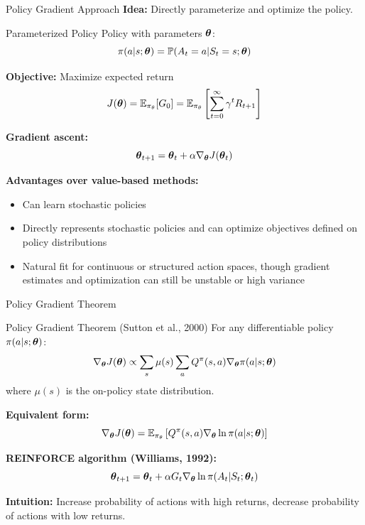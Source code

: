 \documentclass[aspectratio=169]{beamer}
\begin{document}
\begin{frame}{Policy Gradient Approach}
  \textbf{Idea:} Directly parameterize and optimize the policy.

  \vspace{0.5em}

  \begin{definitionbox}{Parameterized Policy}
    Policy with parameters $\boldsymbol{\theta}$:
    $$\pi(a|s; \boldsymbol{\theta}) = \mathbb{P}(A_t = a | S_t = s; \boldsymbol{\theta})$$
  \end{definitionbox}

  \vspace{0.5em}

  \textbf{Objective:} Maximize expected return
  $$J(\boldsymbol{\theta}) = \mathbb{E}_{\pi_\theta}[G_0] = \mathbb{E}_{\pi_\theta}\left[\sum_{t=0}^\infty \gamma^t R_{t+1}\right]$$

  \vspace{0.5em}

  \textbf{Gradient ascent:}
  $$\boldsymbol{\theta}_{t+1} = \boldsymbol{\theta}_t + \alpha \nabla_{\boldsymbol{\theta}} J(\boldsymbol{\theta}_t)$$

  \vspace{0.5em}

  \textbf{Advantages over value-based methods:}
  \begin{itemize}
    \item Can learn stochastic policies
    \item Directly represents stochastic policies and can optimize objectives defined on policy distributions
    \item Natural fit for continuous or structured action spaces, though gradient estimates and optimization can still be unstable or high variance
  \end{itemize}
\end{frame}

\begin{frame}{Policy Gradient Theorem}
  \begin{theorembox}{Policy Gradient Theorem (Sutton et al., 2000)}
    For any differentiable policy $\pi(a|s;\boldsymbol{\theta})$:
    $$\nabla_{\boldsymbol{\theta}} J(\boldsymbol{\theta}) \propto \sum_s \mu(s) \sum_a Q^\pi(s,a) \nabla_{\boldsymbol{\theta}} \pi(a|s;\boldsymbol{\theta})$$
    where $\mu(s)$ is the on-policy state distribution.
  \end{theorembox}

  \vspace{0.5em}

  \textbf{Equivalent form:}
  $$\nabla_{\boldsymbol{\theta}} J(\boldsymbol{\theta}) = \mathbb{E}_{\pi_\theta}\left[Q^\pi(s,a) \nabla_{\boldsymbol{\theta}} \ln \pi(a|s;\boldsymbol{\theta})\right]$$

  \vspace{0.5em}

  \textbf{REINFORCE algorithm (Williams, 1992):}
  $$\boldsymbol{\theta}_{t+1} = \boldsymbol{\theta}_t + \alpha G_t \nabla_{\boldsymbol{\theta}} \ln \pi(A_t|S_t;\boldsymbol{\theta}_t)$$

  \vspace{0.5em}

  \textbf{Intuition:} Increase probability of actions with high returns, decrease probability of actions with low returns.
\end{frame}
\end{document}
